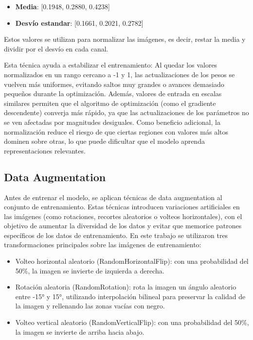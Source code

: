 \begin{itemize}
	\item \textbf{Media}: [0.1948, 0.2880, 0.4238]
	\item \textbf{Desvío estandar}: [0.1661, 0.2021, 0.2782]
\end{itemize}

Estos valores se utilizan para normalizar las imágenes, es decir, restar la media y dividir por el desvío en cada canal.

Esta técnica ayuda a estabilizar el entrenamiento: Al quedar los valores normalizados en un rango cercano a -1 y 1, las actualizaciones de los pesos se vuelven más uniformes, evitando saltos muy grandes o avances demasiado pequeños durante la optimización. Además, valores de entrada en escalas similares permiten que el algoritmo de optimización (como el gradiente descendente) converja más rápido, ya que las actualizaciones de los parámetros no se ven afectadas por magnitudes desiguales. Como beneficio adicional, la normalización reduce el riesgo de que ciertas regiones con valores más altos dominen sobre otras, lo que puede dificultar que el modelo aprenda representaciones relevantes. 

\subsection{Data Augmentation}
Antes de entrenar el modelo, se aplican técnicas de data augmentation al conjunto de entrenamiento. Estas técnicas introducen variaciones artificiales en las imágenes (como rotaciones, recortes aleatorios o volteos horizontales), con el objetivo de aumentar la diversidad de los datos y evitar que memorice patrones específicos de los datos de entrenamiento.
En este trabajo se utilizaron tres transformaciones principales sobre las imágenes de entrenamiento:

\begin{itemize}
	\item Volteo horizontal aleatorio (RandomHorizontalFlip): con una probabilidad del 50\%, la imagen se invierte de izquierda a derecha.
	\item Rotación aleatoria (RandomRotation): rota la imagen un ángulo aleatorio entre -15° y 15°, utilizando interpolación bilineal para preservar la calidad de la imagen y rellenando las zonas vacías con negro.
	\item{Volteo vertical aleatorio (RandomVerticalFlip): con una probabilidad del 50\%, la imagen se invierte de arriba hacia abajo.}
\end{itemize}


